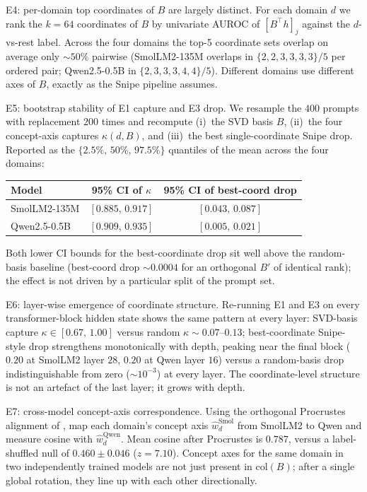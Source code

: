 \documentclass[11pt]{article}
\begin{document}
E4: per-domain top coordinates of $B$ are largely distinct.
For each domain $d$ we rank the $k{=}64$ coordinates of $B$ by
univariate AUROC of $[B^\top h]_j$ against the $d$-vs-rest label.
Across the four domains the top-5 coordinate sets overlap on average
only $\sim 50\%$ pairwise (SmolLM2-135M overlaps in
$\{2,2,3,3,3,3\}/5$ per ordered pair; Qwen2.5-0.5B in
$\{2,3,3,3,4,4\}/5$). Different domains use
different axes of $B$, exactly as the Snipe pipeline assumes.

E5: bootstrap stability of E1 capture and E3 drop.
We resample the $400$ prompts with replacement $200$ times and
recompute (i)~the SVD basis $B$, (ii)~the four concept-axis captures
$\kappa(d, B)$, and (iii)~the best single-coordinate Snipe drop.
Reported as the $\{2.5\%,\,50\%,\,97.5\%\}$ quantiles of the mean
across the four domains:
\begin{center}
\begin{tabular}{lcc}
\toprule
Model & 95\% CI of $\kappa$ & 95\% CI of best-coord drop \\
\midrule
SmolLM2-135M & $[0.885,\,0.917]$ & $[0.043,\,0.087]$ \\
Qwen2.5-0.5B & $[0.909,\,0.935]$ & $[0.005,\,0.021]$ \\
\bottomrule
\end{tabular}
\end{center}
Both lower CI bounds for the best-coordinate drop sit
well above the random-basis baseline (best-coord drop
$\sim 0.0004$ for an orthogonal $B'$ of identical rank); the effect
is not driven by a particular split of the prompt set.

E6: layer-wise emergence of coordinate structure.
Re-running E1 and E3 on every transformer-block hidden state shows
the same pattern at every layer: SVD-basis capture
$\kappa \in [0.67,\,1.00]$ versus random $\kappa \sim 0.07$--$0.13$;
best-coordinate Snipe-style drop strengthens monotonically with
depth, peaking near the final block ($0.20$ at SmolLM2 layer $28$,
$0.20$ at Qwen layer $16$) versus a random-basis drop indistinguishable
from zero ($\sim 10^{-3}$) at every layer. The coordinate-level
structure is not an artefact of the last layer; it grows with depth.

E7: cross-model concept-axis correspondence.
Using the orthogonal Procrustes alignment of
, map each domain's concept
axis $\hat w_d^{\text{Smol}}$ from SmolLM2 to Qwen and measure cosine
with $\hat w_d^{\text{Qwen}}$. Mean cosine after Procrustes is
$0.787$, versus a label-shuffled null of $0.460 \pm 0.046$
($z{=}7.10$). Concept axes for the same domain in two independently
trained models are not just present in $\mathrm{col}(B)$; after a
single global rotation, they line up with each other directionally.
\end{document}
